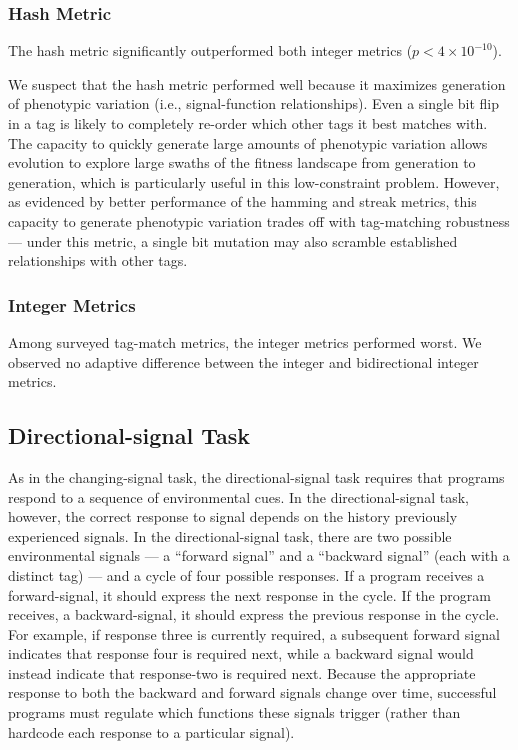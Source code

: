 \subsubsection{Hash Metric}

The hash metric significantly outperformed both integer metrics ($p < 4\times10^{-10}$).

We suspect that the hash metric performed well because it maximizes generation of phenotypic variation (i.e., signal-function relationships).
Even a single bit flip in a tag is likely to completely re-order which other tags it best matches with.
The capacity to quickly generate large amounts of phenotypic variation allows evolution to explore large swaths of the fitness landscape from generation to generation, which is particularly useful in this low-constraint problem.
However, as evidenced by better performance of the hamming and streak metrics, this capacity to generate phenotypic variation trades off with tag-matching robustness --- under this metric, a single bit mutation may also scramble established relationships with other tags.

\subsubsection{Integer Metrics}

Among surveyed tag-match metrics, the integer metrics performed worst.
We observed no adaptive difference  between the integer and bidirectional integer metrics.

\subsection{Directional-signal Task} \label{sec:directional-signal}



As in the changing-signal task, the directional-signal task requires that programs respond to a sequence of environmental cues.
In the directional-signal task, however, the correct response to signal depends on the history previously experienced signals.
In the directional-signal task, there are two possible environmental signals --- a ``forward signal'' and a ``backward signal'' (each with a distinct tag) ---  and a cycle of four possible responses.
If a program receives a forward-signal, it should express the next response in the cycle.
If the program receives, a backward-signal, it should express the previous response in the cycle.
For example, if response three is currently required, a subsequent forward signal indicates that response four is required next, while a backward signal would instead indicate that response-two is required next.
Because the appropriate response to both the backward and forward signals change over time, successful programs must regulate which functions these signals trigger (rather than hardcode each response to a particular signal).

